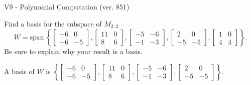 \begin{exercise}
  \begin{exerciseTitle}V9 - Polynomial Computation (ver. 851)\end{exerciseTitle}
  \begin{exerciseStatement}
    Find a basis for the subspace of \(M_{2,2}\) 
\[W=\mathrm{span}\ \left\{\left[\begin{array}{cc}
-6 & 0 \\
-6 & -5
\end{array}\right] , \left[\begin{array}{cc}
11 & 0 \\
8 & 6
\end{array}\right] , \left[\begin{array}{cc}
-5 & -6 \\
-1 & -3
\end{array}\right] , \left[\begin{array}{cc}
2 & 0 \\
-5 & -5
\end{array}\right] , \left[\begin{array}{cc}
1 & 0 \\
4 & 4
\end{array}\right]\right\}.\]
 Be sure to explain why your result is a basis.


  \end{exerciseStatement}
  \begin{exerciseAnswer}
   A basis of \(W\) is  \(\left\{\left[\begin{array}{cc}
-6 & 0 \\
-6 & -5
\end{array}\right] , \left[\begin{array}{cc}
11 & 0 \\
8 & 6
\end{array}\right] , \left[\begin{array}{cc}
-5 & -6 \\
-1 & -3
\end{array}\right] , \left[\begin{array}{cc}
2 & 0 \\
-5 & -5
\end{array}\right]\right\}\).
  


  \end{exerciseAnswer}
\end{exercise}